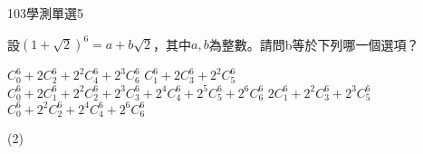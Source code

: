    \begin{QUESTION}
        \begin{ExamInfo}{103}{學測}{單選}{5}
        \end{ExamInfo}
        \begin{ExamAnsRateInfo}{69}{97}{77}{33}
        \end{ExamAnsRateInfo}
        \begin{QBODY}
            設${{(1+\sqrt{2})}^{6}}=a+b\sqrt{2}$，其中$a,b$為整數。請問b等於下列哪一個選項？
			\begin{QOPS}
				\QOP $C_{0}^{6}+2C_{2}^{6}+{{2}^{2}}C_{4}^{6}+{{2}^{3}}C_{6}^{6}$
				\QOP $C_{1}^{6}+2C_{3}^{6}+{{2}^{2}}C_{5}^{6}$
				\QOP $C_{0}^{6}+2C_{1}^{6}+{{2}^{2}}C_{2}^{6}+{{2}^{3}}C_{3}^{6}+{{2}^{4}}C_{4}^{6}+{{2}^{5}}C_{5}^{6}+{{2}^{6}}C_{6}^{6}$
				\QOP $2C_{1}^{6}+{{2}^{2}}C_{3}^{6}+{{2}^{3}}C_{5}^{6}$
				\QOP $C_{0}^{6}+{{2}^{2}}C_{2}^{6}+{{2}^{4}}C_{4}^{6}+{{2}^{6}}C_{6}^{6}$
			\end{QOPS}
        \end{QBODY}
        \begin{QFROMS}
        \end{QFROMS}
        \begin{QTAGS}\end{QTAGS}
        \begin{QANS}
            (2)
        \end{QANS}
        \begin{QSOLLIST}
        \end{QSOLLIST}
        \begin{QEMPTYSPACE}
        \end{QEMPTYSPACE}
    \end{QUESTION}

